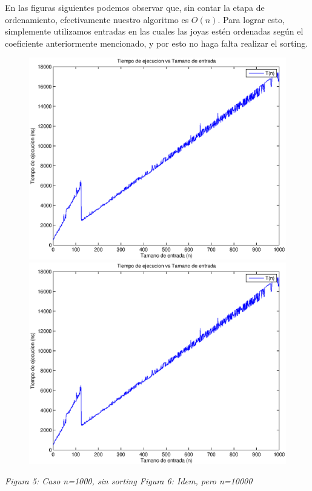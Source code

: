 En las figuras siguientes podemos observar que, sin contar la etapa de ordenamiento, efectivamente nuestro algoritmo es $O(n)$. Para lograr esto, simplemente utilizamos entradas en las cuales las joyas estén ordenadas según el coeficiente anteriormente mencionado, y por esto no haga falta realizar el sorting.

\begin{figure}[H]
    \includegraphics[width=0.5\linewidth]{problema1/graficos/problema1_aleatoria_1000.eps}
    \includegraphics[width=0.5\linewidth]{problema1/graficos/problema1_aleatoria_1000.eps}
\end{figure}
\emph{\hspace{2cm}Figura 5: Caso n=1000, sin sorting \hspace{2,5cm}Figura 6: Idem, pero n=10000}
